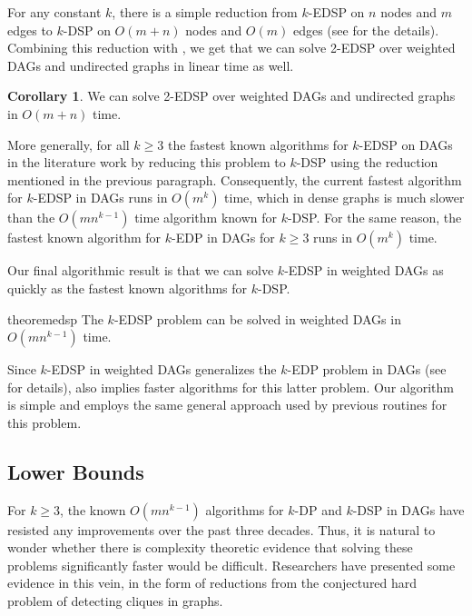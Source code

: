\documentclass[11pt]{article}
\theoremstyle{definition}
\newtheorem{corollary}[theorem]{Corollary}
\begin{document}
For any constant $k$, there is a simple reduction from \textsf{$k$-EDSP} on $n$ nodes and $m$ edges to \textsf{$k$-DSP} on $O(m+n)$ nodes and $O(m)$ edges (see  for the details).
Combining this reduction with , we get that we can solve \textsf{2-EDSP} over weighted DAGs and undirected graphs in linear time as well.

\begin{corollary}
    \label{corr:2-EDSP}
    We can solve \textsf{2-EDSP} over weighted DAGs and undirected graphs in $O(m+n)$ time.
\end{corollary}

More generally, for all $k\ge 3$ the fastest known algorithms for \textsf{$k$-EDSP} on DAGs in the literature work by reducing this problem to \textsf{$k$-DSP} using the reduction mentioned in the previous paragraph.
Consequently, the current fastest algorithm for \textsf{$k$-EDSP} in DAGs runs in $O(m^k)$ time, which in dense graphs is much slower than the $O(mn^{k-1})$ time algorithm known for \textsf{$k$-DSP}.
For the same reason, the fastest known algorithm for \textsf{$k$-EDP} in DAGs for $k\ge 3$ runs in $O(m^k)$ time.

Our final algorithmic result is that we can solve \textsf{$k$-EDSP} in weighted DAGs as quickly as the fastest known algorithms for \textsf{$k$-DSP}.

\begin{restatable}{theorem}{edsp}
    \label{thm:edsp}
        The \textsf{$k$-EDSP} problem can be solved in weighted DAGs in $O(mn^{k-1})$ time.    
\end{restatable}

Since \textsf{$k$-EDSP} in weighted DAGs generalizes the \textsf{$k$-EDP} problem in DAGs (see  for details),
 also implies faster algorithms for this latter problem.
Our algorithm is simple and employs the same general approach used by previous routines \cite{FortuneHopcroftWyllie1980,BercziKobayashi2017} for this problem.

\subsection*{Lower Bounds}

For $k\ge 3$, the known $O(mn^{k-1})$ algorithms for \textsf{$k$-DP} and \textsf{$k$-DSP} in DAGs have resisted any improvements over the past three decades.
Thus, it is natural to wonder whether there is complexity theoretic evidence that solving these problems significantly faster would be difficult. 
Researchers have presented some evidence in this vein, in the form of reductions from the conjectured hard problem of detecting  cliques in graphs.
\end{document}
